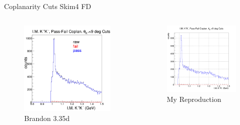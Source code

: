 \documentclass[aspectratio=169]{beamer}
\begin{document}
\begin{frame}{Coplanarity Cuts \hfill Skim4 FD}
\vspace*{-0.6cm}
    \begin{columns}
    \begin{figure}
        \centering
        \includegraphics[width=0.94\textwidth]{brandon_figs/35d.png}
        \caption{Brandon 3.35d}
    \end{figure}
    \begin{figure}
        \centering
        \includegraphics[width=0.97\textwidth]{pdfs/35d.png}
        \caption{My Reproduction}
    \end{figure}
    \end{columns}
\end{frame}
\end{document}
